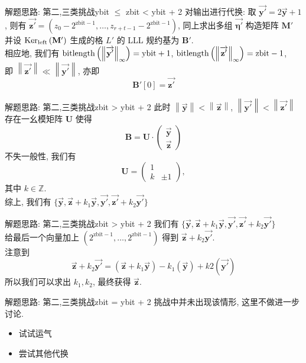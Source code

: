 \documentclass[10pt,compress]{beamer}
\newcommand{\Z}{\ensuremath{\mathbb{Z}}\xspace}
\newcommand{\bitlength}[1]{\ensuremath{\textnormal{bitlength}\left(#1\right)}\xspace}
\newcommand{\mat}[1]{\mathbf{#1}\xspace}
\newcommand{\leftkernel}[1]{\ensuremath{\textnormal{Ker}_{\textnormal{left}}\left(#1\right)}\xspace}
\newcommand{\norm}[1]{\left\lVert#1\right\rVert}
\newcommand{\norminf}[1]{\left\lVert#1\right\rVert_\infty}
\renewcommand{\vec}[1]{\overrightarrow{\mathbf{#1}}\xspace}
\begin{document}
\begin{frame}{解题思路: 第二,三类挑战}{ybit $\leq$ zbit < ybit + 2}
  对输出进行代换: 取 $\vec{y'} = 2\vec{y}+1$, 则有 $\vec{z'} = \left(z_0-2^{\text{zbit}-1}, \ldots, z_{r+t-1}-2^{\text{zbit}-1}\right)$, 同上求出多组 $\vec{\eta'}$ 构造矩阵 $\mat{M'}$ 并设 $\leftkernel{\mat{M'}}$ 生成的格 $L'$ 的 LLL 规约基为 $\mat{B'}$. \\
  \bigbreak
  \pause
  相应地, 我们有 $\bitlength{\norminf{\vec{y'}}} = \text{ybit} + 1$, $\bitlength{\norminf{\vec{z'}}} = \text{zbit} - 1$, \\
  \medbreak
  即 $\norm{\vec{z'}} \ll \norm{\vec{y'}}$, 亦即
  $$
  \mat{B'}[0] = \vec{z'}
  $$
\end{frame}

\begin{frame}{解题思路: 第二,三类挑战}{zbit > ybit + 2}
  此时 $\norm{\vec{y}} < \norm{\vec{z}}$, $\norm{\vec{y'}} < \norm{\vec{z'}}$ \\
  \pause
  存在一幺模矩阵 $\mat{U}$ 使得
  $$
  \mat{B} = \mat{U} \cdot
  \begin{pmatrix}
    \vec{y} \\
    \vec{z}
  \end{pmatrix}
  $$
  不失一般性, 我们有
  $$
  \mat{U} =
  \begin{pmatrix}
    1 & \\
    k &\pm 1
  \end{pmatrix},
  $$
  其中 $k \in \Z$. \\
  \pause
  综上, 我们有 $\{\vec{y}, \vec{z}+k_1\vec{y}, \vec{y'}, \vec{z'}+k_2\vec{y'}\}$
\end{frame}

\begin{frame}{解题思路: 第二,三类挑战}{zbit > ybit + 2}
  我们有 $\{\vec{y}, \vec{z}+k_1\vec{y}, \vec{y'}, \vec{z'}+k_2\vec{y'}\}$ \\
  \bigbreak
  \bigbreak
  \bigbreak
  \pause
  给最后一个向量加上 $\left(2^{\text{zbit}-1}, \ldots, 2^{\text{zbit}-1}\right)$ 得到 $\vec{z} + k_2\vec{y'}$. \\
  \pause
  注意到
  $$
  \vec{z} + k_2\vec{y'} = (\vec{z}+k_1\vec{y}) - k_1(\vec{y}) + k2(\vec{y'})
  $$
  所以我们可以求出 $k_1, k_2$, 最终获得 $\vec{z}$.
\end{frame}

\begin{frame}{解题思路: 第二,三类挑战}{zbit = ybit + 2}
  挑战中并未出现该情形, 这里不做进一步讨论. \\
  \pause
  \bigbreak
  \bigbreak
  \begin{itemize}
    \item 试试运气
    \item 尝试其他代换
  \end{itemize}
\end{frame}
\end{document}
